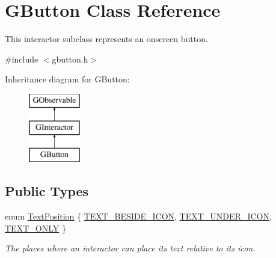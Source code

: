 \hypertarget{classGButton}{}\section{G\+Button Class Reference}
\label{classGButton}


This interactor subclass represents an onscreen button.  




{\ttfamily \#include $<$gbutton.\+h$>$}

Inheritance diagram for G\+Button\+:\begin{figure}[H]
\begin{center}
\leavevmode
\includegraphics[height=3.000000cm]{classGButton}
\end{center}
\end{figure}
\subsection*{Public Types}
\begin{DoxyCompactItemize}
\item 
enum \mbox{\hyperlink{classGInteractor_a8e0d441725a81d2bbdebbea09078260e}{Text\+Position}} \{ \mbox{\hyperlink{classGInteractor_a8e0d441725a81d2bbdebbea09078260ea4cd6f2e7d5a08d6f4dc052df2358f774}{T\+E\+X\+T\+\_\+\+B\+E\+S\+I\+D\+E\+\_\+\+I\+C\+ON}}, 
\mbox{\hyperlink{classGInteractor_a8e0d441725a81d2bbdebbea09078260eaa88490f63d8de68d44c83bdb2ecde3b3}{T\+E\+X\+T\+\_\+\+U\+N\+D\+E\+R\+\_\+\+I\+C\+ON}}, 
\mbox{\hyperlink{classGInteractor_a8e0d441725a81d2bbdebbea09078260ea39a6f388a30ac4fefb6eb13e846bc9f2}{T\+E\+X\+T\+\_\+\+O\+N\+LY}}
 \}
\begin{DoxyCompactList}\small\item\em The places where an interactor can place its text relative to its icon. \end{DoxyCompactList}\end{DoxyCompactItemize}
